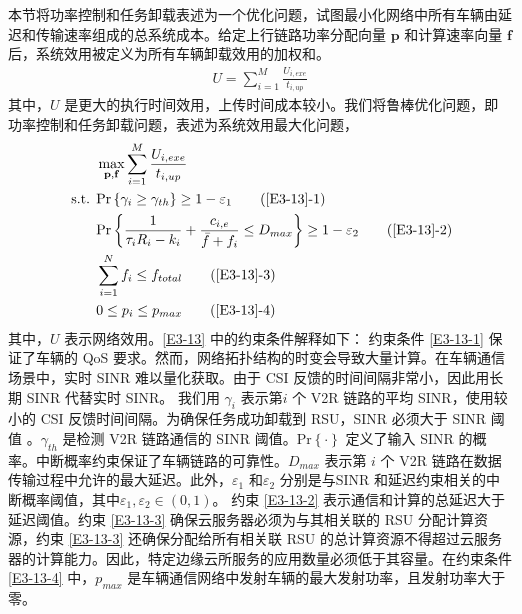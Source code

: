 本节将功率控制和任务卸载表述为一个优化问题，试图最小化网络中所有车辆由延迟和传输速率组成的总系统成本。给定上行链路功率分配向量 $\mathbf{p}$ 和计算速率向量 $\mathbf{f}$ 后，系统效用被定义为所有车辆卸载效用的加权和。
\begin{eqnarray}\label{E12}
U=\sum_{i=1}^{M}\frac{U_{i,exe}}{t_{i,up}}
\end{eqnarray}
其中，$U$ 是更大的执行时间效用，上传时间成本较小。我们将鲁棒优化问题，即功率控制和任务卸载问题，表述为系统效用最大化问题，
\begin{align}
& \max\limits_{\mathbf{p},\mathbf{f}}\sum_{i=1}^{M}\frac{U_{i,exe}}{t_{i,up}}                                   \label{E3-13}\\
\text { s.t. }
& \textrm{Pr}\left\{\gamma_i\geq\gamma_{th}\right\}\geq1-\varepsilon_1                                         \tag{\ref{E3-13}{-1}}      \label{E3-13-1}\\  %
& \textrm{Pr}\left\{\frac{1}{\tau_iR_i-k_i}+\frac{c_{i,e}}{\bar{f}+f_i}\le D_{max}\right\}\geq1-\varepsilon_2  \tag{\ref{E3-13}{-2}}      \label{E3-13-2}\\  %
& \sum_{i=1}^{N}f_i\le f_{total}                                                                                \tag{\ref{E3-13}{-3}}      \label{E3-13-3}\\  %
& 0\le p_i\le p_{max}                                                                                          \tag{\ref{E3-13}{-4}}      \label{E3-13-4} %
\end{align}
其中，$U$ 表示网络效用。\eqref{E3-13} 中的约束条件解释如下： 约束条件 \eqref{E3-13-1} 保证了车辆的 QoS 要求。然而，网络拓扑结构的时变会导致大量计算。在车辆通信场景中，实时 SINR 难以量化获取。由于 CSI 反馈的时间间隔非常小，因此用长期 SINR 代替实时 SINR。 我们用 $\gamma_i$ 表示第$i$ 个 V2R {链路的平均 SINR，使用较小的 CSI 反馈时间间隔}。为确保任务成功卸载到 RSU，SINR 必须大于 SINR 阈值 \cite{liu2021}。$\gamma_{th}$ 是检测 V2R 链路通信的 SINR 阈值。$\textrm{Pr}\left\{\cdot\right\}$ 定义了输入 SINR 的概率。中断概率约束保证了车辆链路的可靠性。$D_{max}$ 表示第 $i$ 个 V2R 链路在数据传输过程中允许的最大延迟。此外，$\varepsilon_1$ 和$\varepsilon_2$ 分别是与SINR 和延迟约束相关的中断概率阈值，其中$\varepsilon_1,\varepsilon_2\in\left(0,1\right)$。 约束 \eqref{E3-13-2} 表示通信和计算的总延迟大于延迟阈值。约束 \eqref{E3-13-3} 确保云服务器必须为与其相关联的 RSU 分配计算资源，约束 \eqref{E3-13-3} 还确保分配给所有相关联 RSU 的总计算资源不得超过云服务器的计算能力。因此，特定边缘云所服务的应用数量必须低于其容量。在约束条件 \eqref{E3-13-4} 中，$p_{max}$ 是车辆通信网络中发射车辆的最大发射功率，且发射功率大于零。

